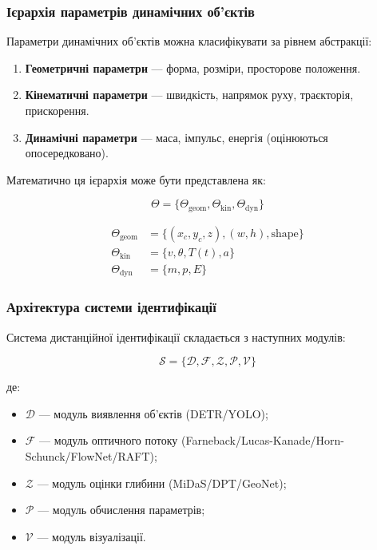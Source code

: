 \documentclass[14pt, a4paper]{extarticle}
\numberwithin{equation}{section}
\begin{document}
\subsubsection{Ієрархія параметрів динамічних об'єктів}

Параметри динамічних об'єктів можна класифікувати за рівнем абстракції:

\begin{enumerate}
    \item \textbf{Геометричні параметри} — форма, розміри, просторове положення.
    \item \textbf{Кінематичні параметри} — швидкість, напрямок руху, траєкторія, прискорення.
    \item \textbf{Динамічні параметри} — маса, імпульс, енергія (оцінюються опосередковано).
\end{enumerate}

Математично ця ієрархія може бути представлена як:

\begin{equation}
\Theta = \{\Theta_{\text{geom}}, \Theta_{\text{kin}}, \Theta_{\text{dyn}}\} \tag{3.2}
\end{equation}

\begin{align}
\Theta_{\text{geom}} &= \{(x_c, y_c, z), (w, h), \text{shape}\} \tag{3.3} \\
\Theta_{\text{kin}} &= \{v, \theta, T(t), a\} \tag{3.4} \\
\Theta_{\text{dyn}} &= \{m, p, E\} \tag{3.5}
\end{align}

\subsubsection{Архітектура системи ідентифікації}

Система дистанційної ідентифікації складається з наступних модулів:

\begin{equation}
\mathcal{S} = \{\mathcal{D}, \mathcal{F}, \mathcal{Z}, \mathcal{P}, \mathcal{V}\} \tag{3.6}
\end{equation}

де:
\begin{itemize}
\item $\mathcal{D}$ — модуль виявлення об'єктів (DETR/YOLO);
\item $\mathcal{F}$ — модуль оптичного потоку (Farneback/Lucas-Kanade/Horn-Schunck/FlowNet/RAFT);
\item $\mathcal{Z}$ — модуль оцінки глибини (MiDaS/DPT/GeoNet);
\item $\mathcal{P}$ — модуль обчислення параметрів;
\item $\mathcal{V}$ — модуль візуалізації.
\end{itemize}
\end{document}
